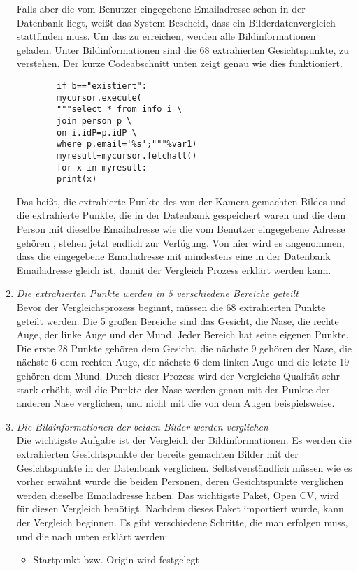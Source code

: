 \begin{enumerate}
	Falls aber die vom Benutzer eingegebene Emailadresse schon in der Datenbank liegt, weißt das System Bescheid, dass ein Bilderdatenvergleich stattfinden muss. Um das zu erreichen, werden alle Bildinformationen geladen. Unter Bildinformationen sind die 68 extrahierten Gesichtspunkte, zu verstehen. Der kurze Codeabschnitt unten zeigt genau wie dies funktioniert. 
		\begin{lstlisting}
		if b=="existiert":
		mycursor.execute(
		"""select * from info i \
		join person p \
		on i.idP=p.idP \
		where p.email='%s';"""%var1)
		myresult=mycursor.fetchall()
		for x in myresult:
		print(x)
		\end{lstlisting}
	Das heißt, die extrahierte Punkte des von der Kamera gemachten Bildes und die extrahierte Punkte, die in der Datenbank gespeichert waren und die dem Person mit dieselbe Emailadresse wie die vom Benutzer eingegebene Adresse gehören , stehen jetzt endlich zur Verfügung. Von hier wird es angenommen, dass die eingegebene Emailadresse mit mindestens eine in der Datenbank Emailadresse gleich ist, damit der Vergleich Prozess erklärt werden kann.
	\item \textit{Die extrahierten Punkte werden in 5 verschiedene Bereiche geteilt} \\
	
	Bevor der Vergleichsprozess beginnt, müssen die 68 extrahierten Punkte geteilt werden. Die 5 großen Bereiche sind das Gesicht, die Nase, die rechte Auge, der linke Auge und der Mund. Jeder Bereich hat seine eigenen Punkte. Die erste 28 Punkte gehören dem Gesicht, die nächste 9 gehören der Nase, die nächste 6 dem rechten Auge, die nächste 6 dem linken Auge und die letzte 19 gehören dem Mund. Durch dieser Prozess wird der Vergleichs Qualität sehr stark erhöht, weil die Punkte der Nase werden genau mit der Punkte der anderen Nase verglichen, und nicht mit die von dem Augen beispielsweise.
	\item \textit{Die Bildinformationen der beiden Bilder werden verglichen} \\
	
Die wichtigste Aufgabe ist der Vergleich der Bildinformationen. Es werden die extrahierten Gesichtspunkte der bereits gemachten Bilder mit der Gesichtspunkte in der Datenbank verglichen. Selbstverständlich müssen wie es vorher erwähnt wurde die beiden Personen, deren Gesichtspunkte verglichen werden dieselbe Emailadresse haben. Das wichtigste Paket, Open CV, wird für diesen Vergleich ben{\"o}tigt. Nachdem dieses Paket importiert wurde, kann der Vergleich beginnen. Es gibt verschiedene Schritte, die man erfolgen muss, und die nach unten erklärt werden:
\begin{itemize}
	\item Startpunkt bzw. Origin wird festgelegt \\
	

\end{itemize}
\end{enumerate}
